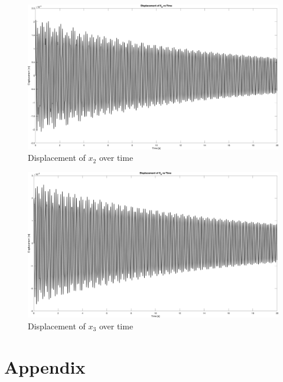 \documentclass{article}
\begin{document}
\begin{figure}[H]
    \vspace{-10pt}
    \includegraphics[width=1\textwidth,left]{MCHE 6390/Project 1/Figures/Figure_5.png}
    \captionsetup{justification=raggedright,singlelinecheck=false}
    \caption{Displacement of $x_2$ over time}
    \label{fig:x_2_forced}
\end{figure}

\begin{figure}[H]
    \vspace{-10pt}
    \includegraphics[width=1\textwidth,left]{MCHE 6390/Project 1/Figures/Figure_6.png}
    \captionsetup{justification=raggedright,singlelinecheck=false}
    \caption{Displacement of $x_3$ over time}
    \label{fig:x_3_forced}
\end{figure}

\section*{Appendix}
\end{document}

